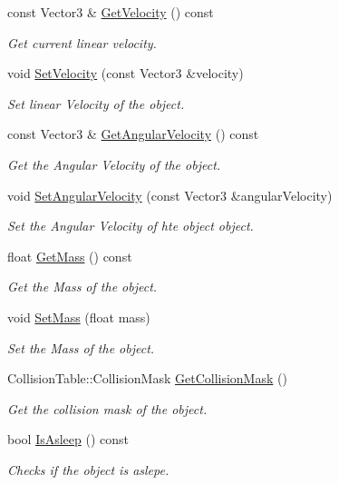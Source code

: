 \begin{DoxyCompactItemize}
const Vector3 \& \hyperlink{classRigidbodyComponent_a11febd70a9d94963f6f7daf2f521b091}{Get\+Velocity} () const
\begin{DoxyCompactList}\small\item\em Get current linear velocity. \end{DoxyCompactList}\item 
void \hyperlink{classRigidbodyComponent_ab85528e62b5a1a81c5f6b9af821c6eb5}{Set\+Velocity} (const Vector3 \&velocity)
\begin{DoxyCompactList}\small\item\em Set linear Velocity of the object. \end{DoxyCompactList}\item 
const Vector3 \& \hyperlink{classRigidbodyComponent_affcd899b87d83aa4147793481f17f5af}{Get\+Angular\+Velocity} () const
\begin{DoxyCompactList}\small\item\em Get the Angular Velocity of the object. \end{DoxyCompactList}\item 
void \hyperlink{classRigidbodyComponent_afba758ae0f34f537aa207ec405dd947e}{Set\+Angular\+Velocity} (const Vector3 \&angular\+Velocity)
\begin{DoxyCompactList}\small\item\em Set the Angular Velocity of hte object object. \end{DoxyCompactList}\item 
float \hyperlink{classRigidbodyComponent_acf62ca0b197641a3e536e38e5b90f0b1}{Get\+Mass} () const
\begin{DoxyCompactList}\small\item\em Get the Mass of the object. \end{DoxyCompactList}\item 
void \hyperlink{classRigidbodyComponent_a9e75d7dfef39fcccdd9ddf7416188d57}{Set\+Mass} (float mass)
\begin{DoxyCompactList}\small\item\em Set the Mass of the object. \end{DoxyCompactList}\item 
Collision\+Table\+::\+Collision\+Mask \hyperlink{classRigidbodyComponent_a6b7cc610ebeac138cddc580c746e3eb2}{Get\+Collision\+Mask} ()
\begin{DoxyCompactList}\small\item\em Get the collision mask of the object. \end{DoxyCompactList}\item 
bool \hyperlink{classRigidbodyComponent_a5ea94f888c37f71c6e7206b0497f1bc8}{Is\+Asleep} () const
\begin{DoxyCompactList}\small\item\em Checks if the object is aslepe. \end{DoxyCompactList}\end{DoxyCompactItemize}

